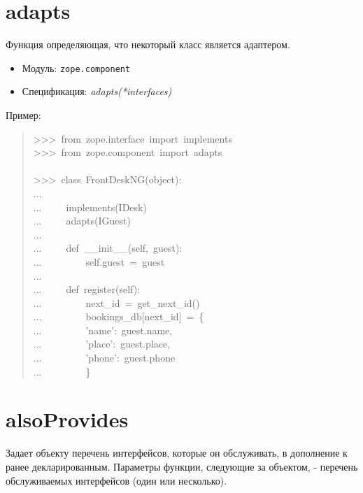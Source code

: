 \documentclass[14pt,a4paper,openany,twoside,final]{extbook}
\providecommand*{\DUroletitlereference}[1]{\textsl{#1}}
\begin{document}
\section*{adapts%
  \label{adapts}%
}

Функция определяющая, что некоторый класс является адаптером.

\begin{itemize}

\item Модуль: \texttt{zope.component}

\item Спецификация: \DUroletitlereference{adapts(*interfaces)}

\end{itemize}

Пример:

\begin{quote}{\ttfamily \raggedright \noindent
>{}>{}>~from~zope.interface~import~implements\\
>{}>{}>~from~zope.component~import~adapts\\
~\\
>{}>{}>~class~FrontDeskNG(object):\\
...\\
...~~~~~implements(IDesk)\\
...~~~~~adapts(IGuest)\\
...\\
...~~~~~def~\_\_init\_\_(self,~guest):\\
...~~~~~~~~~self.guest~=~guest\\
...\\
...~~~~~def~register(self):\\
...~~~~~~~~~next\_id~=~get\_next\_id()\\
...~~~~~~~~~bookings\_db{[}next\_id{]}~=~\{\\
...~~~~~~~~~'name':~guest.name,\\
...~~~~~~~~~'place':~guest.place,\\
...~~~~~~~~~'phone':~guest.phone\\
...~~~~~~~~~\}
}
\end{quote}


\section*{alsoProvides%
  \label{alsoprovides}%
}

Задает объекту перечень интерфейсов, которые он обслуживать, в дополнение
к ранее декларированным.  Параметры функции, следующие за объектом, -
перечень обслуживаемых интерфейсов (один или несколько).
\end{document}
